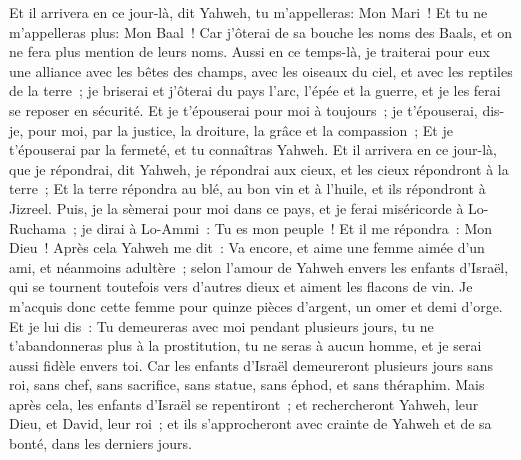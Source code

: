 \begin{multicols}{2}
 Et il arrivera en ce jour-là, dit Yahweh, tu m'appelleras: Mon Mari~! Et tu ne m'appelleras plus: Mon Baal~!
Car j'ôterai de sa bouche les noms des Baals, et on ne fera plus mention de leurs noms.
Aussi en ce temps-là, je traiterai pour eux une alliance avec les bêtes des champs, avec les oiseaux du ciel, et avec les reptiles de la terre~; je briserai et j'ôterai du pays l'arc, l'épée et la guerre, et je les ferai se reposer en sécurité.
Et je t'épouserai pour moi à toujours~; je t'épouserai, dis-je, pour moi, par la justice, la droiture, la grâce et la compassion~;
Et je t'épouserai par la fermeté, et tu connaîtras Yahweh.
Et il arrivera en ce jour-là, que je répondrai, dit Yahweh, je répondrai aux cieux, et les cieux répondront à la terre~;
Et la terre répondra au blé, au bon vin et à l'huile, et ils répondront à Jizreel.
Puis, je la sèmerai pour moi dans ce pays, et je ferai miséricorde à Lo-Ruchama~; je dirai à Lo-Ammi~: Tu es mon peuple~! Et il me répondra~: Mon Dieu~!
\VerseOne{}Après cela Yahweh me dit~: Va encore, et aime une femme aimée d'un ami, et néanmoins adultère~; selon l'amour de Yahweh envers les enfants d'Israël, qui se tournent toutefois vers d'autres dieux et aiment les flacons de vin.
Je m'acquis donc cette femme pour quinze pièces d'argent, un omer et demi d'orge.
Et je lui dis~: Tu demeureras avec moi pendant plusieurs jours, tu ne t'abandonneras plus à la prostitution, tu ne seras à aucun homme, et je serai aussi fidèle envers toi.
Car les enfants d'Israël demeureront plusieurs jours sans roi, sans chef, sans sacrifice, sans statue, sans éphod, et sans théraphim.
Mais après cela, les enfants d'Israël se repentiront~; et rechercheront Yahweh, leur Dieu, et David, leur roi~; et ils s'approcheront avec crainte de Yahweh et de sa bonté, dans les derniers jours.

\end{multicols}
